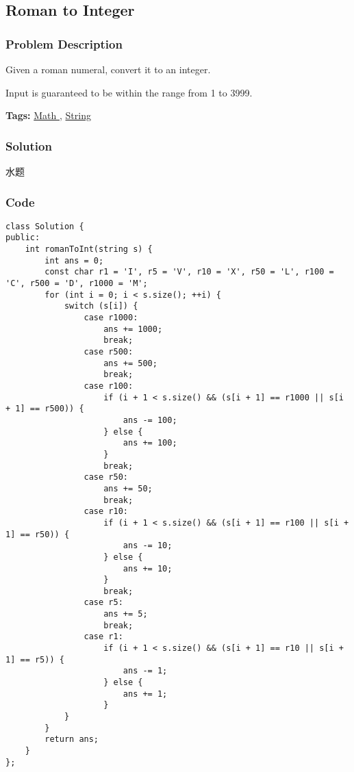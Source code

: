 \documentclass{article}
\begin{document}
\begin{CJK*}{UTF8}{gkai}
\subsection{ Roman to Integer }
\label{ Roman to Integer }

\subsubsection*{Problem Description}
Given a roman numeral, convert it to an integer.

Input is guaranteed to be within the range from 1 to 3999.


\textbf{Tags: }
\hyperref[ Math ]{ Math },  \hyperref[ String ]{ String }



\subsubsection*{Solution}
水题

\subsubsection*{Code}
\begin{lstlisting}
class Solution {
public:
    int romanToInt(string s) {
        int ans = 0;
        const char r1 = 'I', r5 = 'V', r10 = 'X', r50 = 'L', r100 = 'C', r500 = 'D', r1000 = 'M';
        for (int i = 0; i < s.size(); ++i) {
            switch (s[i]) {
                case r1000:
                    ans += 1000;
                    break;
                case r500:
                    ans += 500;
                    break;
                case r100:
                    if (i + 1 < s.size() && (s[i + 1] == r1000 || s[i + 1] == r500)) {
                        ans -= 100;
                    } else {
                        ans += 100;
                    }
                    break;
                case r50:
                    ans += 50;
                    break;
                case r10:
                    if (i + 1 < s.size() && (s[i + 1] == r100 || s[i + 1] == r50)) {
                        ans -= 10;
                    } else {
                        ans += 10;
                    }
                    break;
                case r5:
                    ans += 5;
                    break;
                case r1:
                    if (i + 1 < s.size() && (s[i + 1] == r10 || s[i + 1] == r5)) {
                        ans -= 1;
                    } else {
                        ans += 1;
                    }
            }
        }
        return ans;
    }
}; 
\end{lstlisting}



\end{CJK*}
\end{document}

